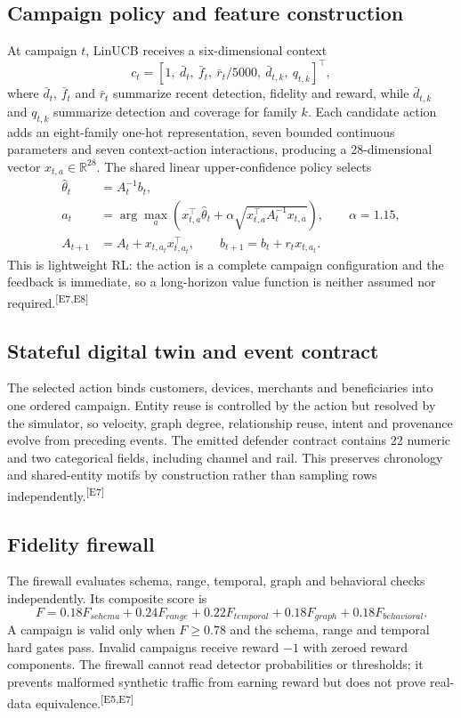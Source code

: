 \documentclass[11pt,a4paper,oneside]{article}
\newcommand{\evidence}[1]{\textsuperscript{\textcolor{EvidenceGray}{[#1]}}}
\newcommand{\R}{\mathbb{R}}
\begin{document}
\subsection{Campaign policy and feature construction}
At campaign $t$, LinUCB receives a six-dimensional context
\[
  c_t = [1,\ \bar d_t,\ \bar f_t,\ \bar r_t/5000,\ \bar d_{t,k},\ q_{t,k}]^\top,
\]
where $\bar d_t$, $\bar f_t$ and $\bar r_t$ summarize recent detection, fidelity and reward, while $\bar d_{t,k}$ and $q_{t,k}$ summarize detection and coverage for family $k$. Each candidate action adds an eight-family one-hot representation, seven bounded continuous parameters and seven context-action interactions, producing a 28-dimensional vector $x_{t,a}\in\R^{28}$. The shared linear upper-confidence policy selects
\begin{align}
  \hat\theta_t &= A_t^{-1}b_t, \\
  a_t &= \arg\max_a \left(x_{t,a}^\top\hat\theta_t + \alpha\sqrt{x_{t,a}^\top A_t^{-1}x_{t,a}}\right), \qquad \alpha=1.15, \\
  A_{t+1} &= A_t + x_{t,a_t}x_{t,a_t}^\top, \qquad b_{t+1}=b_t+r_tx_{t,a_t}.
\end{align}
This is lightweight RL: the action is a complete campaign configuration and the feedback is immediate, so a long-horizon value function is neither assumed nor required.\evidence{E7,E8}

\subsection{Stateful digital twin and event contract}
The selected action binds customers, devices, merchants and beneficiaries into one ordered campaign. Entity reuse is controlled by the action but resolved by the simulator, so velocity, graph degree, relationship reuse, intent and provenance evolve from preceding events. The emitted defender contract contains 22 numeric and two categorical fields, including channel and rail. This preserves chronology and shared-entity motifs by construction rather than sampling rows independently.\evidence{E7}

\subsection{Fidelity firewall}
The firewall evaluates schema, range, temporal, graph and behavioral checks independently. Its composite score is
\[
  F = 0.18F_{schema}+0.24F_{range}+0.22F_{temporal}+0.18F_{graph}+0.18F_{behavioral}.
\]
A campaign is valid only when $F\geq0.78$ and the schema, range and temporal hard gates pass. Invalid campaigns receive reward $-1$ with zeroed reward components. The firewall cannot read detector probabilities or thresholds; it prevents malformed synthetic traffic from earning reward but does not prove real-data equivalence.\evidence{E5,E7}
\end{document}
